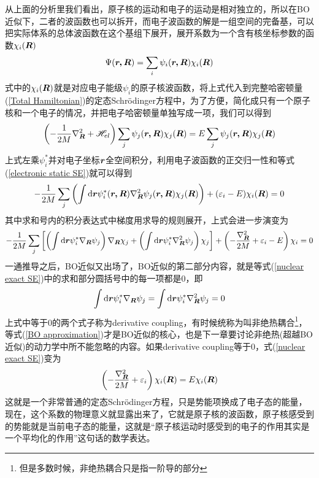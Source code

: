 \documentclass[12pt,a4paper,openany,twoside]{book}
\numberwithin{equation}{section}
\newcommand{\sch}{Schr\"odinger}
\newcommand{\ud}{\mathrm{d}}
\begin{document}
        从上面的分析里我们看出，原子核的运动和电子的运动是相对独立的，所以在BO近似下，二者的波函数也可以拆开，而电子波函数的解是一组空间的完备基，可以把实际体系的总体波函数在这个基组下展开，展开系数为一个含有核坐标参数的函数$ \chi_i(\vb*{R})$
        \begin{equation}
          \Psi(\vb*{r,R})=\sum_{i}\psi_i(\vb*{r,R}) \chi_i(\vb*{R})
        \end{equation}
        式中的$\chi_i(\vb*{R})$就是对应电子能级$\psi_i$的原子核波函数，将上式代入到完整哈密顿量(\ref{Total Hamiltonian})的定态\sch 方程中，为了方便，简化成只有一个原子核和一个电子的情况，并把电子哈密顿量单独写成一项，我们可以得到
        \begin{equation}
          \left(- \frac { 1 } { 2 M } \nabla _ {\vb*{R} } ^ { 2 } +\mathscr { H } _{el} \right)\sum_{j}\psi_j(\vb*{r,R}) \chi_j(\vb*{R}) = E\sum_{j}\psi_j(\vb*{r,R}) \chi_j(\vb*{R})
        \end{equation}
        上式左乘$\psi_i^*$并对电子坐标$\vb*{r}$全空间积分，利用电子波函数的正交归一性和等式(\ref{electronic static SE})就可以得到
        \begin{equation}
          -\frac{1}{2M}\sum_j \left(\int \ud \vb*{r} \psi_i^*(\vb*{r,R})\nabla _ { \vb*{R}} ^ { 2 }\psi_j(\vb*{r,R})\chi_j(\vb*{R} )\right)+(\varepsilon_i - E)\chi_i(\vb*{R} ) = 0
        \end{equation}
        其中求和号内的积分表达式中梯度用求导的规则展开，上式会进一步演变为
        \begin{equation}
          -\frac{1}{2M}\sum_j\left[\left(\int \ud \vb*{r}\psi_i^*\nabla _ { \vb*{R}}\psi_j \right) \nabla _ { \vb*{R}}\chi_j + \left(\int \ud \vb*{r}\psi_i^*\nabla _ { \vb*{R}}^2\psi_j \right)\chi_j \right]+\left(-\frac{\nabla _ { \vb*{R}}^2}{2M} + \varepsilon_i -E\right)\chi_i = 0
          \label{nuclear exact SE}
        \end{equation}
        一通推导之后，BO近似又出场了，BO近似的第二部分内容，就是等式(\ref{nuclear exact SE})中的求和部分圆括号中的每一项都是0，即
        \begin{equation}
          \int \ud \vb*{r}\psi_i^*\nabla _ { \vb*{R}}\psi_j = \int \ud \vb*{r}\psi_i^*\nabla _ { \vb*{R}}^2\psi_j = 0
          \label{BO approximation}
        \end{equation}
        上式中等于0的两个式子称为derivative coupling，有时候统称为叫非绝热耦合\footnote{但是多数时候，非绝热耦合只是指一阶导的部分}，等式(\ref{BO approximation})才是BO近似的核心，也是下一章要讨论非绝热(超越BO近似)的动力学中所不能忽略的内容。如果derivative coupling等于0，式(\ref{nuclear exact SE})变为
        \begin{equation}
          \left(-\frac{\nabla _ { \vb*{R}}^2}{2M} + \varepsilon_i\right)\chi_i(\vb*{R}) = E\chi_i(\vb*{R})
        \end{equation}
        这就是一个非常普通的定态\sch 方程，只是势能项换成了电子态的能量，现在，这个系数的物理意义就显露出来了，它就是原子核的波函数，原子核感受到的势能就是当前电子态的能量，这就是“原子核运动时感受到的电子的作用其实是一个平均化的作用”这句话的数学表达。
\end{document}
